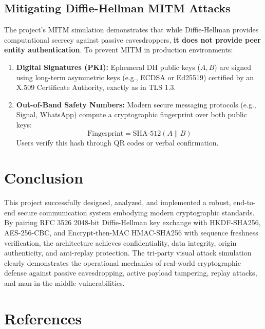 \documentclass[11pt,a4paper]{article}
\begin{document}
\subsection{Mitigating Diffie-Hellman MITM Attacks}
The project's MITM simulation demonstrates that while Diffie-Hellman provides computational secrecy against passive eavesdroppers, \textbf{it does not provide peer entity authentication}. To prevent MITM in production environments:
\begin{enumerate}[leftmargin=1cm]
    \item \textbf{Digital Signatures (PKI):} Ephemeral DH public keys ($A, B$) are signed using long-term asymmetric keys (e.g., ECDSA or Ed25519) certified by an X.509 Certificate Authority, exactly as in TLS 1.3.
    \item \textbf{Out-of-Band Safety Numbers:} Modern secure messaging protocols (e.g., Signal, WhatsApp) compute a cryptographic fingerprint over both public keys:
    \begin{equation}
        \text{Fingerprint} = \text{SHA-512}(A \parallel B)
    \end{equation}
    Users verify this hash through QR codes or verbal confirmation.
\end{enumerate}

\section{Conclusion}
This project successfully designed, analyzed, and implemented a robust, end-to-end secure communication system embodying modern cryptographic standards. By pairing RFC 3526 2048-bit Diffie-Hellman key exchange with HKDF-SHA256, AES-256-CBC, and Encrypt-then-MAC HMAC-SHA256 with sequence freshness verification, the architecture achieves confidentiality, data integrity, origin authenticity, and anti-replay protection. The tri-party visual attack simulation clearly demonstrates the operational mechanics of real-world cryptographic defense against passive eavesdropping, active payload tampering, replay attacks, and man-in-the-middle vulnerabilities.

\section*{References}
\end{document}
